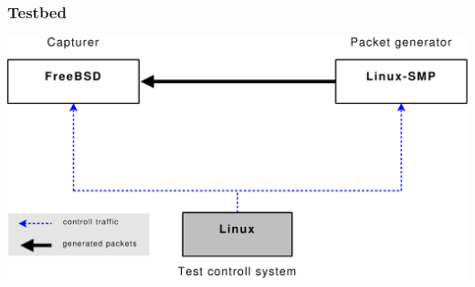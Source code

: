 \documentclass{beamer}
\begin{document}
%
%
\begin{frame}
\frametitle{Testbed}
\begin{center}
\includegraphics [height=0.68\textheight]{pics/Messaufbau}
\end{center}
\end{frame}
\end{document}
